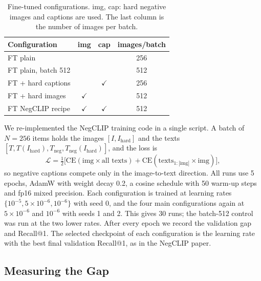 \documentclass{article}
\begin{document}
\begin{table}[t]
\caption{Fine-tuned configurations. img, cap: hard negative images and captions are used. The last column is the number of images per batch.}
\label{tab:configs}
\begin{center}
\begin{small}
\begin{tabular}{lccc}
\toprule
Configuration & img & cap & images/batch \\
\midrule
FT plain & & & 256 \\
FT plain, batch 512 & & & 512 \\
FT + hard captions & & $\checkmark$ & 256 \\
FT + hard images & $\checkmark$ & & 512 \\
FT NegCLIP recipe & $\checkmark$ & $\checkmark$ & 512 \\
\bottomrule
\end{tabular}
\end{small}
\end{center}
\vskip -0.1in
\end{table}

We re-implemented the NegCLIP training code in a single script. A batch of $N{=}256$ items holds the images $[I, I_{\text{hard}}]$ and the texts $[T, T(I_{\text{hard}}), T_{\text{neg}}, T_{\text{neg}}(I_{\text{hard}})]$, and the loss is
\begin{equation}
\mathcal{L} = \tfrac{1}{2}\big[\mathrm{CE}(\text{img}\times\text{all texts}) + \mathrm{CE}(\text{texts}_{1:|\text{img}|}\times\text{img})\big],
\label{eq:loss}
\end{equation}
so negative captions compete only in the image-to-text direction. All runs use 5 epochs, AdamW \citep{loshchilov2019adamw} with weight decay 0.2, a cosine schedule with 50 warm-up steps and fp16 mixed precision. Each configuration is trained at learning rates $\{10^{-5}, 5{\times}10^{-6}, 10^{-6}\}$ with seed 0, and the four main configurations again at $5{\times}10^{-6}$ and $10^{-6}$ with seeds 1 and 2. This gives 30 runs; the batch-512 control was run at the two lower rates. After every epoch we record the validation gap and Recall@1. The selected checkpoint of each configuration is the learning rate with the best final validation Recall@1, as in the NegCLIP paper.

\subsection{Measuring the Gap}
\end{document}
